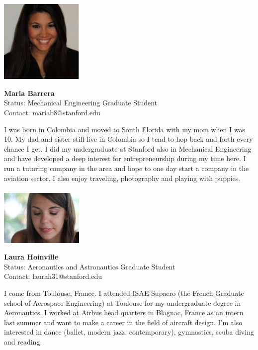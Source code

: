 \noindent \includegraphics[width=40mm]{images/image011.jpg}
\parbox[b]{0.6\textwidth}{\textbf{Maria Barrera}\\
Status: Mechanical Engineering Graduate Student\\
Contact: mariab8@stanford.edu\\
}

I was born in Colombia and moved to South Florida with my mom when I was 10. My dad and sister still live in Colombia so I tend to hop back and forth every chance I get. I did my undergraduate at Stanford also in Mechanical Engineering and have developed a deep interest for entrepreneurship during my time here. I run a tutoring company in the area and hope to one day start a company in the aviation sector. I also enjoy traveling, photography and playing with puppies.
\\ \\


\noindent \includegraphics[width=40mm]{images/image012bis}
\parbox[b]{0.6\textwidth}{\textbf{Laura Hoinville}\\
Status: Aeronautics and Astronautics Graduate Student\\
Contact:  laurah31@stanford.edu \\
}

I come from Toulouse, France. I attended ISAE-Supaero (the French Graduate school of Aerospace Engineering) at Toulouse for my undergraduate degree in Aeronautics. I worked at Airbus head quarters in Blagnac, France as an intern last summer and want to make a career in the field of aircraft design. I'm also interested in dance (ballet, modern jazz, contemporary), gymnastics, scuba diving and reading.
\\ \\


